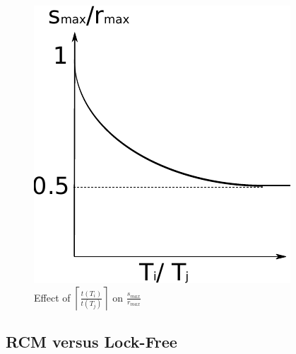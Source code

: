 \documentclass[a4paper,english]{article}
\begin{document}
\begin{figure}
\begin{centering}
\includegraphics[scale=0.5]{figures/figure14}
\par\end{centering}
\caption{\label{fig14}Effect of $\left\lceil\frac{t(T_{i})}{t(T_{j})}\right\rceil$ on
$\frac{s_{max}}{r_{max}}$}
\end{figure}


\subsection{RCM versus Lock-Free}
\end{document}
